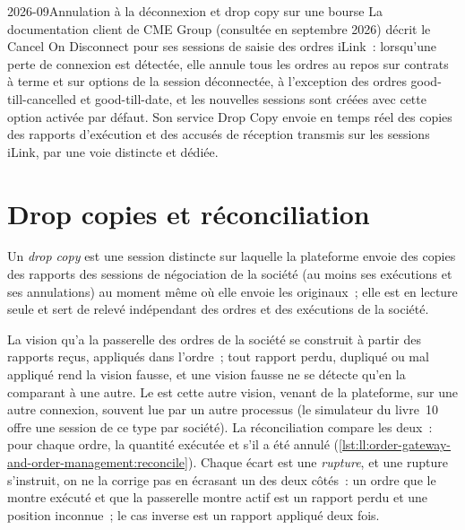 \begin{dated}{2026-09}{Annulation à la déconnexion et drop copy sur une bourse}\label{dat:ll:order-gateway-and-order-management:cme}
La documentation client de CME Group (consultée en septembre 2026) décrit le Cancel On Disconnect pour ses sessions de saisie des ordres iLink~: lorsqu'une
perte de connexion est détectée, elle annule tous les ordres au repos sur contrats à terme et sur options de la session déconnectée,
à l'exception des ordres good-till-cancelled et good-till-date, et les nouvelles sessions sont créées avec cette option activée par défaut. Son service Drop Copy
envoie en temps réel des copies des rapports d'exécution et des accusés de réception transmis sur les sessions iLink, par une voie distincte et
dédiée.
\end{dated}

\section{Drop copies et réconciliation}

\begin{definition}\label{def:ll:order-gateway-and-order-management:dropcopy}
Un \emph{drop copy} est une session distincte sur laquelle la plateforme envoie des copies des rapports des sessions de négociation de la société
(au moins ses exécutions et ses annulations) au moment même où elle envoie les originaux~; elle est en lecture seule et sert de relevé indépendant
des ordres et des exécutions de la société.
\end{definition}

La vision qu'a la passerelle des ordres de la société se construit à partir des rapports reçus, appliqués dans l'ordre~; tout rapport perdu, dupliqué ou mal appliqué
rend la vision fausse, et une vision fausse ne se détecte qu'en la comparant à une autre. Le  est cette autre
vision, venant de la plateforme, sur une autre connexion, souvent lue par un autre processus (le simulateur du livre~10 offre une session de
ce type par société). La réconciliation compare les deux~: pour chaque ordre, la quantité exécutée et s'il a été annulé
(\cref{lst:ll:order-gateway-and-order-management:reconcile}). Chaque écart est une \emph{rupture}, et une rupture s'instruit,
on ne la corrige pas en écrasant un des deux côtés~: un ordre que le  montre exécuté et que la passerelle montre actif est un rapport perdu et une
position inconnue~; le cas inverse est un rapport appliqué deux fois.

